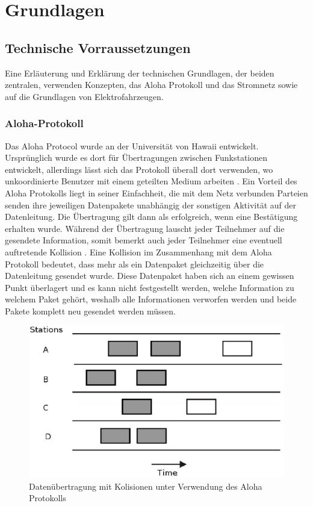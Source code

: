 \chapter{Grundlagen}
\label{chap:grundlagen}

\section{Technische Vorraussetzungen}
Eine Erläuterung und Erklärung der technischen Grundlagen, der beiden zentralen, verwenden Konzepten, das Aloha Protokoll und das Stromnetz sowie auf die Grundlagen von Elektrofahrzeugen.
\subsection{Aloha-Protokoll}
Das Aloha Protocol wurde an der Universität von Hawaii entwickelt. Ursprünglich wurde es dort für Übertragungen zwischen Funkstationen entwickelt, allerdings lässt sich das Protokoll überall dort verwenden, wo unkoordinierte Benutzer mit einem geteilten Medium arbeiten \cite{Back_AlohaPure}. Ein Vorteil des Aloha Protokolls liegt in seiner Einfachheit, die mit dem Netz verbunden Parteien senden ihre jeweiligen Datenpakete unabhängig der sonstigen Aktivität auf der Datenleitung. Die Übertragung gilt dann als erfolgreich, wenn eine Bestätigung erhalten wurde. Während der Übertragung lauscht jeder Teilnehmer auf die gesendete Information, somit bemerkt auch jeder Teilnehmer eine eventuell auftretende Kollision \cite{Back_AlohaPure}. Eine Kollision im Zusammenhang mit dem Aloha Protokoll bedeutet, dass mehr als ein Datenpaket gleichzeitig über die Datenleitung gesendet wurde. Diese Datenpaket haben sich an einem gewissen Punkt überlagert und es kann nicht festgestellt werden, welche Information zu welchem Paket gehört, weshalb alle Informationen verworfen werden und beide Pakete komplett neu gesendet werden müssen. \\
\begin{figure}[h!]
	\begin{center}
	\includegraphics[width=\linewidth]{img/pureAloha.png}
	\caption{Datenübertragung mit Kolisionen unter Verwendung des Aloha Protokolls}
	\end{center}
	\label{Abb2_PureAloha}
\end{figure}
